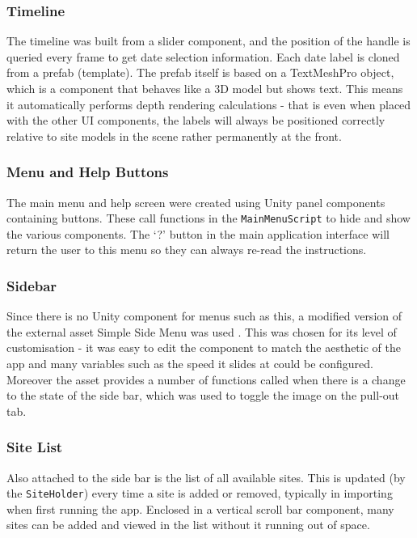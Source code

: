 \documentclass[12pt, a4paper]{article}
\begin{document}
\subsubsection{Timeline}
The timeline was built from a slider component, and the position of the handle is queried every frame to get date selection information. Each date label is cloned from a prefab (template). The prefab itself is based on a TextMeshPro object, which is a component that behaves like a 3D model but shows text. This means it automatically performs depth rendering calculations - that is even when placed with the other UI components, the labels will always be positioned correctly relative to site models in the scene rather permanently at the front.

\subsubsection{Menu and Help Buttons}
The main menu and help screen were created using Unity panel components containing buttons. These call functions in the \verb|MainMenuScript| to hide and show the various components. The `?' button in the main application interface will return the user to this menu so they can always re-read the instructions.

\subsubsection{Sidebar}
Since there is no Unity component for menus such as this, a modified version of the external asset Simple Side Menu was used \cite{design:sidemenu}. This was chosen for its level of customisation - it was easy to edit the component to match the aesthetic of the app and many variables such as the speed it slides at could be configured. Moreover the asset provides a number of functions called when there is a change to the state of the side bar, which was used to toggle the image on the pull-out tab.

\subsubsection{Site List}
Also attached to the side bar is the list of all available sites. This is updated (by the \verb|SiteHolder|) every time a site is added or removed, typically in importing when first running the app. Enclosed in a vertical scroll bar component, many sites can be added and viewed in the list without it running out of space.
\end{document}
